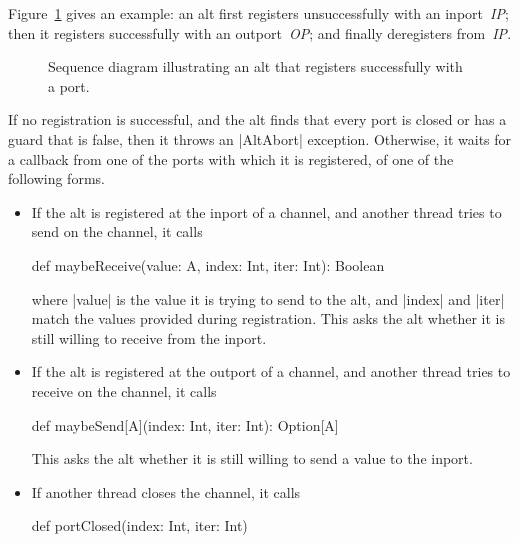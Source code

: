 \def\IP{\emph{IP}}
\def\OP{\emph{OP}}

Figure~\ref{fig:alt-1}
gives an example: an alt first registers unsuccessfully with an inport~\IP;
then it registers successfully with an outport~\OP; and finally deregisters
from~\IP. 


\begin{figure}
\begin{center}
\def\height{5.5} %
\def\gap{3.5} %
\end{center}
\caption{Sequence diagram illustrating an alt that registers successfully with
  a port. \label{fig:alt-1}}
\end{figure}


If no registration is successful, and the alt finds that every port is closed
or has a guard that is false, then it throws an |AltAbort| exception.
Otherwise, it waits for a callback from one of the ports with which it is
registered, of one of the following forms.
%
\begin{itemize}
\item If the alt is registered at the inport of a channel, and another thread
  tries to send on the channel, it calls
\begin{scala}
def maybeReceive(value: A, index: Int, iter: Int): Boolean
\end{scala}
%
where |value| is the value it is trying to send to the alt, and |index| and
|iter| match the values provided during registration.  This asks the alt
whether it is still willing to receive from the inport.

\item If the alt is registered at the outport of a channel, and another thread
  tries to receive on the channel, it calls
%
\begin{scala}
def maybeSend[A](index: Int, iter: Int): Option[A]
\end{scala}
%
This asks the alt whether it is still willing to send a value to the inport.

\item If another thread closes the channel, it calls 
%
\begin{scala}
def portClosed(index: Int, iter: Int)
\end{scala}
\end{itemize}

